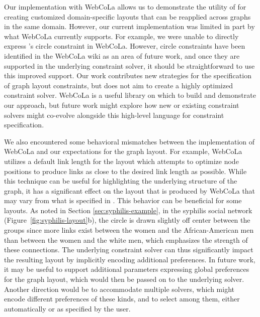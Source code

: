 
Our implementation with WebCoLa allows us to demonstrate the utility of
\projectname for creating customized domain-specific layouts that can be
reapplied across graphs in the same domain. However, our current
implementation was limited in part by what WebCoLa currently supports. For
example, we were unable to directly express \projectname's circle constraint in
WebCoLa.  However, circle constraints have been identified in the WebCoLa
wiki as an area of future work, and once they are supported in the
underlying constraint solver, it should be straightforward to use
this improved support. Our work contributes new strategies for the
specification of graph layout constraints, but does not aim to create a
highly optimized constraint solver. WebCoLa is a useful
library on which to build and demonstrate our approach, but 
future work might explore how new or existing constraint solvers might
co-evolve alongside this high-level language for constraint specification.

We also encountered some behavioral mismatches between the implementation
of WebCoLa and our expectations for the graph layout. For example, WebCoLa
utilizes a default link length for the layout which attempts to optimize
node positions to produce links as close to the desired link length as
possible. While this technique can be useful for highlighting the underlying 
structure of the graph, it has a significant effect on the layout that is
produced by WebCoLa that may vary from what is specified in \projectname.
This behavior can be beneficial for some layouts.
As noted in Section \ref{sec:syphilis-example}, in the syphilis social network
(Figure~\ref{fig:syphilis-layout}b), the circle is drawn slightly off
center between the groups since more links exist between the
women and the African-American men than between the women and
the white men, which emphasizes the strength of these connections.
The underlying constraint solver can thus
significantly impact the resulting layout by implicitly encoding
additional preferences. In future work, it may be useful to support
additional parameters expressing global preferences for the graph layout,
which would then be passed on to the underlying solver. Another direction
would be to accommodate multiple solvers, which might encode different
preferences of these kinds, and to select among them, either automatically
or as specified by the user.

